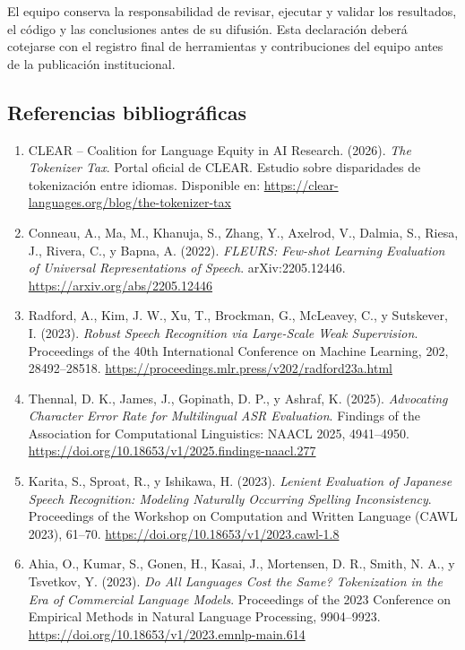 \documentclass[letterpaper,11pt]{article}
\begin{document}
El equipo conserva la responsabilidad de revisar,
ejecutar y validar los resultados, el código y las
conclusiones antes de su difusión. Esta declaración
deberá cotejarse con el registro final de herramientas
y contribuciones del equipo antes de la publicación
institucional.

\subsection*{Referencias bibliográficas}

\begin{enumerate}[leftmargin=*,itemsep=7pt]

\item CLEAR -- Coalition for Language Equity in AI Research.
(2026). \textit{The Tokenizer Tax}. Portal oficial de CLEAR.
Estudio sobre disparidades de tokenización entre idiomas.
Disponible en:
\url{https://clear-languages.org/blog/the-tokenizer-tax}

\item Conneau, A., Ma, M., Khanuja, S., Zhang, Y.,
Axelrod, V., Dalmia, S., Riesa, J., Rivera, C., y
Bapna, A. (2022).
\textit{FLEURS: Few-shot Learning Evaluation of Universal
Representations of Speech}.
arXiv:2205.12446.
\url{https://arxiv.org/abs/2205.12446}

\item Radford, A., Kim, J. W., Xu, T., Brockman, G.,
McLeavey, C., y Sutskever, I. (2023).
\textit{Robust Speech Recognition via Large-Scale Weak
Supervision}.
Proceedings of the 40th International Conference on
Machine Learning, 202, 28492--28518.
\url{https://proceedings.mlr.press/v202/radford23a.html}

\item Thennal, D. K., James, J., Gopinath, D. P.,
y Ashraf, K. (2025).
\textit{Advocating Character Error Rate for Multilingual
ASR Evaluation}.
Findings of the Association for Computational Linguistics:
NAACL 2025, 4941--4950.
\url{https://doi.org/10.18653/v1/2025.findings-naacl.277}

\item Karita, S., Sproat, R., y Ishikawa, H. (2023).
\textit{Lenient Evaluation of Japanese Speech Recognition:
Modeling Naturally Occurring Spelling Inconsistency}.
Proceedings of the Workshop on Computation and Written
Language (CAWL 2023), 61--70.
\url{https://doi.org/10.18653/v1/2023.cawl-1.8}

\item Ahia, O., Kumar, S., Gonen, H., Kasai, J.,
Mortensen, D. R., Smith, N. A., y Tsvetkov, Y. (2023).
\textit{Do All Languages Cost the Same? Tokenization in
the Era of Commercial Language Models}.
Proceedings of the 2023 Conference on Empirical Methods
in Natural Language Processing, 9904--9923.
\url{https://doi.org/10.18653/v1/2023.emnlp-main.614}

\end{enumerate}

\end{document}
